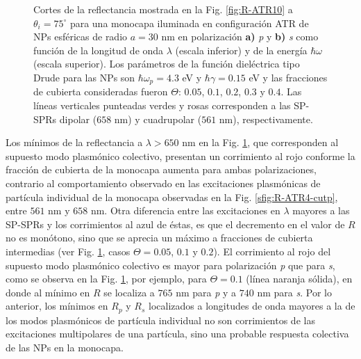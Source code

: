 \begin{figure}[h!]
	\caption{
Cortes de la reflectancia mostrada en la Fig. \ref{fig:R-ATR10} a $\theta_i = 75^\circ$ para una monocapa iluminada en configuración ATR de NPs esféricas de radio $a=30$ nm en polarización \textbf{a)} \emph{p} y \textbf{b)} \emph{s} como función de la longitud de onda $\lambda$ (escala inferior) y de la energía $\hbar\omega$ (escala superior). Los parámetros de la función dieléctrica tipo Drude para las NPs son $\hbar\omega_p = 4.3$ eV y $\hbar\gamma = 0.15$ eV y las fracciones de cubierta consideradas fueron $\Theta$: $0. 05$, $0. 1$, $0. 2$, $0. 3$ y $0. 4$. Las líneas verticales punteadas verdes y rosas corresponden a las SP-SPRs dipolar ($658$ nm) y cuadrupolar ($561$ nm), respectivamente. }\label{fig:R-ATR4-Cuts}
	\end{figure}

Los mínimos de la reflectancia a $\lambda>650$ nm en la Fig. \ref{fig:R-ATR4-Cuts}, que corresponden al supuesto modo plasmónico colectivo, presentan un corrimiento al rojo conforme la fracción de cubierta de la monocapa aumenta  para ambas polarizaciones, contrario al comportamiento observado en las excitaciones plasmónicas de partícula individual de la monocapa observadas en la Fig. \ref{sfig:R-ATR4-cutp}, entre $561$ nm y $658$ nm. Otra diferencia entre las excitaciones en $\lambda$ mayores a las SP-SPRs y los corrimientos al azul de éstas, es que el decremento en el valor de $R$ no es monótono, sino que se aprecia un máximo a fracciones de cubierta intermedias (ver Fig. \ref{fig:R-ATR4-Cuts}, casos $\Theta=0.05$, $0.1$ y $0.2$). El corrimiento al rojo del supuesto modo plasmónico colectivo es mayor para  polarización \emph{p} que para \emph{s}, como se observa en la Fig. \ref{fig:R-ATR4-Cuts}, por ejemplo, para $\Theta=0.1$ (línea naranja sólida), en donde al mínimo en $R$ se localiza a $765$ nm para \emph{p} y  a $740$ nm para \emph{s}. Por lo anterior, los mínimos en $R_p$ y $R_s$ localizados a longitudes de onda mayores a la de los modos plasmónicos de partícula individual no son corrimientos de las excitaciones multipolares de una partícula, sino una probable respuesta colectiva de las NPs en la monocapa. 

